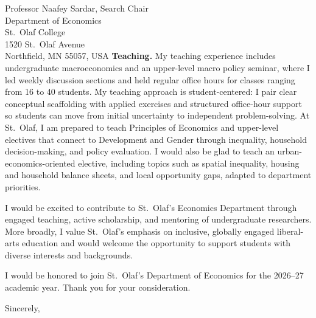 \documentclass[11pt,letterpaper]{letter}
\begin{document}
\begin{letter}{Professor Naafey Sardar, Search Chair \\
Department of Economics \\
St.\ Olaf College \\
1520 St.\ Olaf Avenue \\
Northfield, MN 55057, USA}
\textbf{Teaching.} My teaching experience includes undergraduate macroeconomics and an upper-level macro policy seminar, where I led weekly discussion sections and held regular office hours for classes ranging from 16 to 40 students. My teaching approach is student-centered: I pair clear conceptual scaffolding with applied exercises and structured office-hour support so students can move from initial uncertainty to independent problem-solving. At St.\ Olaf, I am prepared to teach Principles of Economics and upper-level electives that connect to Development and Gender through inequality, household decision-making, and policy evaluation. I would also be glad to teach an urban-economics-oriented elective, including topics such as spatial inequality, housing and household balance sheets, and local opportunity gaps, adapted to department priorities.

I would be excited to contribute to St.\ Olaf’s Economics Department through engaged teaching, active scholarship, and mentoring of undergraduate researchers. More broadly, I value St.\ Olaf’s emphasis on inclusive, globally engaged liberal-arts education and would welcome the opportunity to support students with diverse interests and backgrounds.

I would be honored to join St.\ Olaf’s Department of Economics for the 2026--27 academic year. Thank you for your consideration.

\closing{Sincerely,}

\end{letter}
\end{document}
